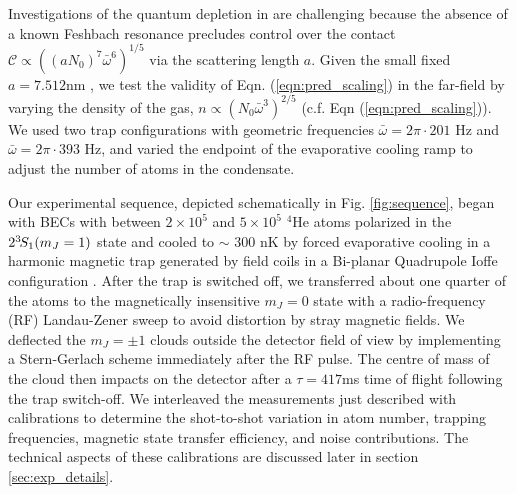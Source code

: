 	Investigations of the quantum depletion in \mhe are challenging because the absence of a known Feshbach resonance precludes control over the contact $\mathcal{C}\propto((a N_0)^7\bar{\omega}^6)^{1/5}$ via the scattering length $a$. 
	Given the small fixed $a=7.512$nm \cite{Moal06}, we test the validity of Eqn. (\ref{eqn:pred_scaling}) in the far-field by varying the density of the gas, $n\propto\left(N_{0}\bar{\omega}^3\right)^{2/5}$ (c.f. Eqn (\ref{eqn:pred_scaling})). 
	We used two trap configurations with geometric frequencies $\bar{\omega} = 2\pi \cdot201$ Hz and $\bar{\omega} = 2\pi \cdot393$ Hz, and varied the endpoint of the evaporative cooling ramp to adjust the number of atoms in the condensate. 
	
	Our experimental sequence, depicted schematically in Fig. \ref{fig:sequence}, began with BECs with between $2\times 10^5$ and $5\times 10^5$ $^4$He atoms polarized in the $2^{3\!}S_1(m_J=1)$ state and cooled to $\sim$ 300 nK by forced evaporative cooling in a harmonic magnetic trap generated by field coils in a Bi-planar Quadrupole Ioffe configuration \cite{Dall07}. 
	After the trap is switched off, we transferred about one quarter of the atoms to the magnetically insensitive $m_J=0$ state with a radio-frequency (RF) Landau-Zener sweep to avoid distortion by stray magnetic fields.
	We deflected the $m_J=\pm 1$ clouds outside the detector field of view by implementing a Stern-Gerlach scheme immediately after the RF pulse. 
	The centre of mass of the cloud then impacts on the detector after a $\tau = 417$ms time of flight following the trap switch-off. 
	We interleaved the measurements just described with calibrations to determine the shot-to-shot variation in atom number, trapping frequencies, magnetic state transfer efficiency, and noise contributions. The technical aspects of these calibrations are discussed later in section \ref{sec:exp_details}.

	




